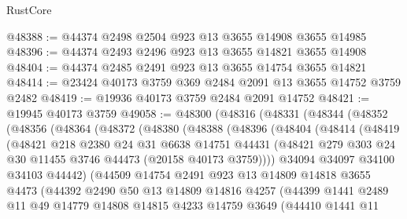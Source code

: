 \begin{lexlean}{RustCore}
\begin{coremodule}
@48388 := @44374 @2498 @2504 @923 @13 @3655 @14908 @3655 @14985
@48396 := @44374 @2493 @2496 @923 @13 @3655 @14821 @3655 @14908
@48404 := @44374 @2485 @2491 @923 @13 @3655 @14754 @3655 @14821
@48414 := @23424 @40173 @3759 @369 @2484 @2091 @13 @3655 @14752 @3759 @2482
@48419 := @19936 @40173 @3759 @2484 @2091 @14752
@48421 := @19945 @40173 @3759
@49058 := @48300
    (@48316
      (@48331
        (@48344
          (@48352
            (@48356
              (@48364
                (@48372
                  (@48380
                    (@48388
                      (@48396
                        (@48404
                          (@48414
                            (@48419
                              (@48421
                                @218
                                @2380
                                @24
                                @31
                                @6638
                                @14751
                                @44431
                                (@48421
                                  @279
                                  @303
                                  @24
                                  @30
                                  @11455
                                  @3746
                                  @44473
                                  (@20158 @40173 @3759))))
                            @34094
                            @34097
                            @34100
                            @34103
                            @44442)
                          (@44509
                            @14754
                            @2491
                            @923
                            @13
                            @14809
                            @14818
                            @3655
                            @4473
                            (@44392
                              @2490
                              @50
                              @13
                              @14809
                              @14816
                              @4257
                              (@44399
                                @1441
                                @2489
                                @11
                                @49
                                @14779
                                @14808
                                @14815
                                @4233
                                @14759
                                @3649
                                (@44410
                                  @1441
                                  @11

\end{coremodule}
\end{lexlean}
